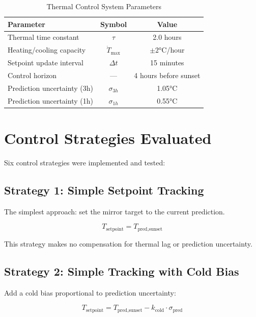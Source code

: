 \documentclass[11pt,letterpaper]{article}
\begin{document}
\begin{table}[h]
\centering
\caption{Thermal Control System Parameters}
\begin{tabular}{lcc}
\toprule
\textbf{Parameter} & \textbf{Symbol} & \textbf{Value} \\
\midrule
Thermal time constant & $\tau$ & 2.0 hours \\
Heating/cooling capacity & $\dot{T}_{\max}$ & $\pm 2$°C/hour \\
Setpoint update interval & $\Delta t$ & 15 minutes \\
Control horizon & --- & 4 hours before sunset \\
Prediction uncertainty (3h) & $\sigma_{3h}$ & 1.05°C \\
Prediction uncertainty (1h) & $\sigma_{1h}$ & 0.55°C \\
\bottomrule
\end{tabular}
\label{tab:parameters}
\end{table}

\section{Control Strategies Evaluated}

Six control strategies were implemented and tested:

\subsection{Strategy 1: Simple Setpoint Tracking}

The simplest approach: set the mirror target to the current prediction.

\begin{equation}
T_{\text{setpoint}} = T_{\text{pred,sunset}}
\end{equation}

This strategy makes no compensation for thermal lag or prediction uncertainty.

\subsection{Strategy 2: Simple Tracking with Cold Bias}

Add a cold bias proportional to prediction uncertainty:

\begin{equation}
T_{\text{setpoint}} = T_{\text{pred,sunset}} - k_{\text{cold}} \cdot \sigma_{\text{pred}}
\label{eq:cold_bias}
\end{equation}
\end{document}
